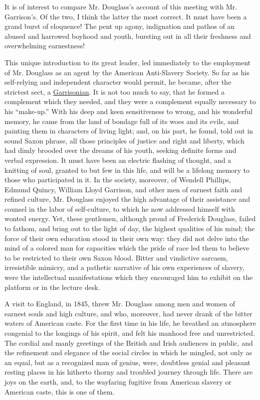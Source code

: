 It is of interest to compare Mr. Douglass's account of this meeting with
Mr. Garrison's. Of the two, I think the latter the most correct. It must
have been a grand burst of eloquence! The pent
{\protect\hypertarget{xxii}{}{}}up agony, indignation and pathos of an
abused and harrowed boyhood and youth, bursting out in all their
freshness and overwhelming earnestness!

This unique introduction to its great leader, led immediately to the
employment of Mr. Douglass as an agent by the American Anti-Slavery
Society. So far as his self-relying and independent character would
permit, he became, after the strictest sect, a
\href{https://en.wikipedia.org/wiki/William_Lloyd_Garrison}{Garrisonian}.
It is not too much to say, that he formed a complement which they
needed, and they were a complement equally necessary to his ``make-up.''
With his deep and keen sensitiveness to wrong, and his wonderful memory,
he came from the land of bondage full of its woes and its evils, and
painting them in characters of living light; and, on his part, he found,
told out in sound Saxon phrase, all those principles of justice and
right and liberty, which had dimly brooded over the dreams of his youth,
seeking definite forms and verbal expression. It must have been an
electric flashing of thought, and a knitting of soul, granted to but few
in this life, and will be a lifelong memory to those who participated in
it. In the society, moreover, of Wendell Phillips, Edmund Quincy,
William Lloyd Garrison, and other men of earnest faith and refined
culture, Mr. Douglass enjoyed the high advantage of their assistance and
counsel in the labor of self-culture, to which he now addressed himself
with wonted energy. Yet, these gentlemen, although proud of Frederick
Douglass, failed to fathom, and bring out to the light of day, the
highest qualities of his mind; the force of their own education stood in
their own way: they did not delve into the mind of a colored man for
capacities which the pride of race led them to believe to be restricted
to their own Saxon blood. Bitter and vindictive sarcasm, irresistible
mimicry, and a pathetic narrative of his own experiences of slavery,
were the intellectual manifestations which they encouraged him to
exhibit on the platform or in the lecture desk.

A visit to England, in 1845, threw Mr. Douglass among men and women of
earnest souls and high culture, and who, moreover, had never drank of
the bitter waters of American caste. For the first time in his life, he
breathed an atmosphere congenial to the longings of his spirit, and felt
his manhood free and unrestricted. The cordial and manly greetings of
the British and Irish audiences in
{\protect\hypertarget{xxiii}{}{}}public, and the refinement and elegance
of the social circles in which he mingled, not only as an equal, but as
a recognized man of genius, were, doubtless genial and pleasant resting
places in his hitherto thorny and troubled journey through life. There
are joys on the earth, and, to the wayfaring fugitive from American
slavery or American caste, this is one of them.


